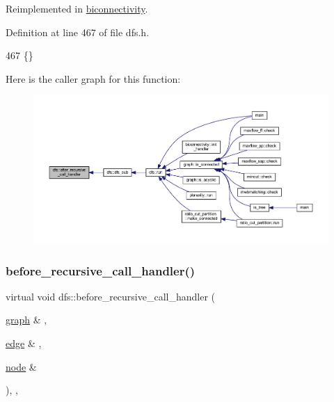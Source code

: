 Reimplemented in \mbox{\hyperlink{classbiconnectivity_a69ca91409485b57c486b188596080d7a}{biconnectivity}}.



Definition at line 467 of file dfs.\+h.


\begin{DoxyCode}
467 \{\}
\end{DoxyCode}
Here is the caller graph for this function\+:
\nopagebreak
\begin{figure}[H]
\begin{center}
\leavevmode
\includegraphics[width=350pt]{classdfs_a92fdca8a77b55d08b129aeab4fc66e4c_icgraph}
\end{center}
\end{figure}
\mbox{\label{classdfs_a401190846f59af2a49ba036e99230152}} 
\subsubsection{\texorpdfstring{before\+\_\+recursive\+\_\+call\+\_\+handler()}{before\_recursive\_call\_handler()}}
{\footnotesize\ttfamily virtual void dfs\+::before\+\_\+recursive\+\_\+call\+\_\+handler (\begin{DoxyParamCaption}\item[{\mbox{\hyperlink{classgraph}{graph}} \&}]{,  }\item[{\mbox{\hyperlink{classedge}{edge}} \&}]{,  }\item[{\mbox{\hyperlink{classnode}{node}} \&}]{ }\end{DoxyParamCaption})\hspace{0.3cm}{\ttfamily [inline]}, {\ttfamily [virtual]}, {\ttfamily [inherited]}}



